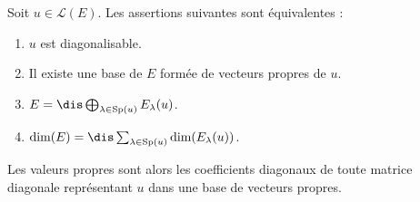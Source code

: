 \documentclass[a4paper,10pt]{report}
\begin{document}
\begin{thm} Soit $u \in \mathcal{L}(E)$. Les assertions suivantes sont équivalentes : 

\begin{enumerate}
\item $u$ est diagonalisable.
\item Il existe une base de $E$ formée de vecteurs propres de $u$.
\item $E = \dis \bigoplus_{\lambda \in \textrm{Sp}(u)} E_{\lambda}(u)$.
\item $\textrm{dim}(E) = \dis \sum_{\lambda \in \textrm{Sp}(u)} \textrm{dim}(E_{\lambda}(u))$.
\end{enumerate}
Les valeurs propres sont alors les coefficients diagonaux de toute matrice diagonale représentant $u$ dans une base de vecteurs propres.
\end{thm}
%
\end{document}
